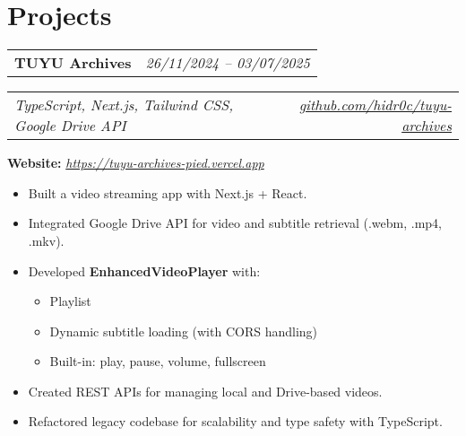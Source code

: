 \documentclass[a4paper,11pt]{article}
\begin{document}
\section{Projects}
\begin{minipage}[t]{\linewidth}
  \begin{tabularx}{\linewidth}{@{}l r@{}}
    \textbf{TUYU Archives} & \hspace*{0.63\linewidth}\normalsize\textit{26/11/2024 – 03/07/2025} \\
  \end{tabularx}
  \begin{tabularx}{\linewidth}{@{}l r@{}}
  \normalsize\textit {TypeScript, Next.js, Tailwind CSS, Google Drive API}& \hspace*{0.255\linewidth}\href{https://github.com/hidr0c/tuyu-archives}{\normalsize\textit{github.com/hidr0c/tuyu-archives}}\\
  \end{tabularx}
  \textbf{Website:} \href{https://tuyu-archives-pied.vercel.app}{\normalsize\textit{https://tuyu-archives-pied.vercel.app}}  
  \begin{itemize}[nosep,leftmargin=1.2em,itemsep=2pt]
  \item Built a video streaming app with Next.js + React.
  \item Integrated Google Drive API for video and subtitle retrieval (.webm, .mp4, .mkv).
  \item Developed \textbf{EnhancedVideoPlayer} with:
  \begin{itemize}
    \item Playlist 
    \item Dynamic subtitle loading (with CORS handling)
    \item Built-in: play, pause, volume, fullscreen
  \end{itemize}
  \item Created REST APIs for managing local and Drive-based videos.
  \item Refactored legacy codebase for scalability and type safety with TypeScript.
  \end{itemize}
\end{minipage}

\vspace{1.5px}
\end{document}
